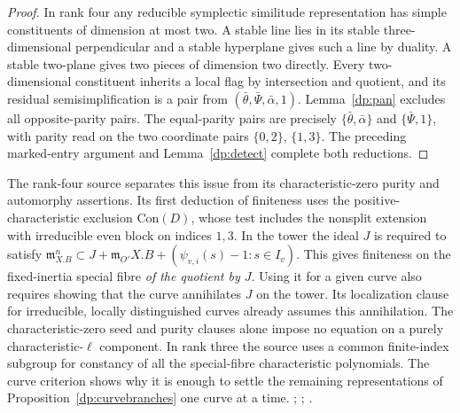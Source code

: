 \begin{proof}
In rank four any reducible symplectic similitude representation
has simple constituents of dimension at most two. A stable line
lies in its stable three-dimensional perpendicular and a stable
hyperplane gives such a line by duality. A stable two-plane gives
two pieces of dimension two directly. Every two-dimensional
constituent inherits a local flag by intersection and quotient,
and its residual semisimplification is a pair from
\((\bar\theta,\bar\Psi,\bar\alpha,1)\). Lemma~\ref{dp:pan} excludes
all opposite-parity pairs. The equal-parity pairs are precisely
\(\{\bar\theta,\bar\alpha\}\) and \(\{\bar\Psi,1\}\), with parity
read on the two coordinate pairs \(\{0,2\}\), \(\{1,3\}\).
The preceding marked-entry argument and Lemma~\ref{dp:detect}
complete both reductions.
\end{proof}

The rank-four source separates this issue from its characteristic-zero
purity and automorphy assertions. Its first deduction of finiteness
uses the positive-characteristic exclusion \(\mathrm{Con}(D)\), whose
test includes the nonsplit extension with irreducible even block on
indices \(1,3\). In the tower the ideal \(J\) is required to satisfy
\(\mathfrak m_{X.B}^n\subset J+\mathfrak m_{O'}X.B+
(\psi_{v,i}(s)-1:s\in I_v)\). This gives finiteness on the
fixed-inertia special fibre \emph{of the quotient by \(J\)}.
Using it for a given curve also requires showing that the curve
annihilates \(J\) on the tower. Its localization clause for
irreducible, locally distinguished curves already assumes this
annihilation. The characteristic-zero seed and purity clauses
alone impose no equation on a purely characteristic-\(\ell\)
component. In rank three the source uses a common finite-index
subgroup for constancy of all the special-fibre characteristic
polynomials. The curve criterion shows why it is enough to
settle the remaining representations of Proposition~\ref{dp:curvebranches}
one curve at a time.
;
;
.
